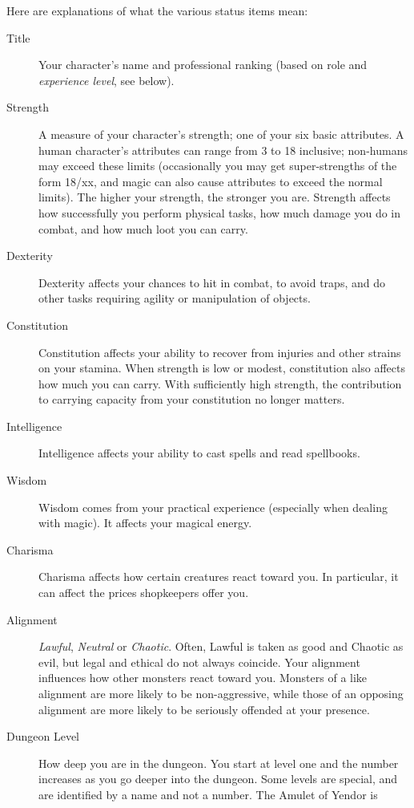 \documentclass[titlepage]{article}
\begin{document}
Here are explanations of what the various status items mean:

\begin{description}
\item[Title]
Your character's name and professional ranking (based on role and
\textit{experience level}, see below).
\item[Strength]
A measure of your character's strength; one of your six basic
attributes.  A human character's attributes can range from 3 to 18 inclusive;
non-humans may exceed these limits
(occasionally you may get super-strengths of the form 18/xx, and magic can
also cause attributes to exceed the normal limits).  The
higher your strength, the stronger you are.  Strength affects how
successfully you perform physical tasks, how much damage you do in
combat, and how much loot you can carry.
\item[Dexterity]
Dexterity affects your chances to hit in combat, to avoid traps, and
do other tasks requiring agility or manipulation of objects.
\item[Constitution]
Constitution affects your ability to recover from injuries and other
strains on your stamina.
When strength is low or modest, constitution also affects how much you
can carry.  With sufficiently high strength, the contribution to
carrying capacity from your constitution no longer matters.
\item[Intelligence]
Intelligence affects your ability to cast spells and read spellbooks.
\item[Wisdom]
Wisdom comes from your practical experience (especially when dealing with
magic).  It affects your magical energy.
\item[Charisma]
Charisma affects how certain creatures react toward you.  In
particular, it can affect the prices shopkeepers offer you.
\item[Alignment]
%
\textit{Lawful}, \textit{Neutral} or \textit{Chaotic}.  Often, Lawful is
taken as good and Chaotic as evil, but legal and ethical do not always
coincide.  Your alignment influences how other
monsters react toward you.  Monsters of a like alignment are more likely
to be non-aggressive, while those of an opposing alignment are more likely
to be seriously offended at your presence.
\item[Dungeon Level]
How deep you are in the dungeon.  You start at level one and the number
increases as you go deeper into the dungeon.  Some levels are special,
and are identified by a name and not a number.  The Amulet of Yendor is

\end{description}
\end{document}
